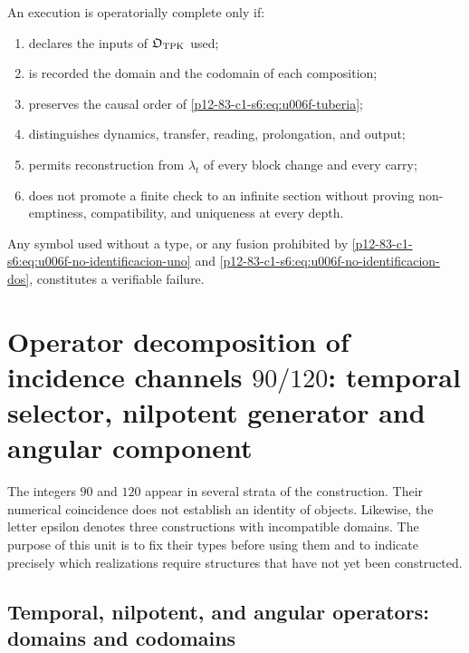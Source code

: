 {\begin{criterion}
\label{p12-83-c1-s6:crit:u006f-completitud}
An execution is operatorially complete only if:
\begin{enumerate}
 \item declares the inputs of \(\mathfrak O_{\rm TPK}\) used;
 \item is recorded the domain and the codomain of each composition;
 \item preserves the causal order of \eqref{p12-83-c1-s6:eq:u006f-tuberia};
 \item distinguishes dynamics, transfer, reading, prolongation, and output;
 \item permits reconstruction from \(\lambda_t\) of every block change and
 every carry;
 \item does not promote a finite check to an infinite section without
 proving non-emptiness, compatibility, and uniqueness at every depth.
\end{enumerate}
Any symbol used without a type, or any fusion prohibited by
\eqref{p12-83-c1-s6:eq:u006f-no-identificacion-uno} and
\eqref{p12-83-c1-s6:eq:u006f-no-identificacion-dos}, constitutes a verifiable failure.
\end{criterion}



\section{Operator decomposition of incidence channels \texorpdfstring{\(90/120\)}{90/120}: temporal selector, nilpotent generator and angular component}
\label{p12-83-c1-s7:chap:canales-90-120-epsilon}

The integers \(90\) and \(120\) appear in several strata of the construction. Their
numerical coincidence does not establish an identity of objects. Likewise,
the letter epsilon denotes three constructions with incompatible domains. The
purpose of this unit is to fix their types before using them and to indicate
precisely which realizations require structures that have not yet been
constructed.

\subsection{Temporal, nilpotent, and angular operators: domains and codomains}

}
